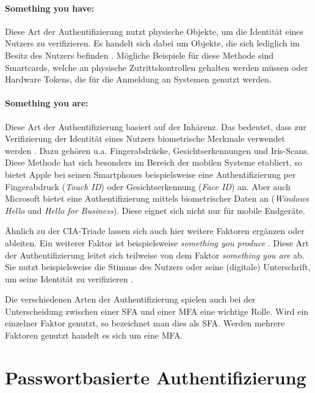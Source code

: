 \paragraph*{Something you have:}
Diese Art der Authentifizierung nutzt physische Objekte, um die Identität eines Nutzers zu verifizieren. Es handelt sich dabei um Objekte, die sich lediglich im Besitz des Nutzers befinden \cite{boonkrong2012security}. Mögliche Beispiele für diese Methode sind Smartcards, welche an physische Zutrittskontrollen gehalten werden müssen oder Hardware Tokens, die für die Anmeldung an Systemen genutzt werden.

\paragraph*{Something you are:}
Diese Art der Authentifizierung basiert auf der Inhärenz. Das bedeutet, dass zur Verifizierung der Identität eines Nutzers biometrische Merkmale verwendet werden \cite{boonkrong2012security}. Dazu gehören u.a. Fingerabdrücke, Gesichtserkennungen und Iris-Scans. Diese Methode hat sich besonders im Bereich der mobilen Systeme etabliert, so bietet Apple bei seinen Smartphones beispielsweise eine Authentifizierung per Fingerabdruck (\textit{Touch ID}) oder Gesichtserkennung (\textit{Face ID}) an. Aber auch Microsoft bietet eine Authentifizierung mittels biometrischer Daten an (\textit{Windows Hello} und \textit{Hello for Business}). Diese eignet sich nicht nur für mobile Endgeräte.

Ähnlich zu der CIA-Triade lassen sich auch hier weitere Faktoren ergänzen oder ableiten. Ein weiterer Faktor ist beispielsweise \textit{something you produce} \cite{boonkrong2012security}. Diese Art der Authentifizierung leitet sich teilweise von dem Faktor \textit{something you are} ab. Sie nutzt beispielsweise die Stimme des Nutzers oder seine (digitale) Unterschrift, um seine Identität zu verifizieren \cite{boonkrong2012security}. 

Die verschiedenen Arten der Authentifizierung spielen auch bei der Unterscheidung zwischen einer \ac{SFA} und einer  \ac{MFA} eine wichtige Rolle. Wird ein einzelner Faktor genutzt, so bezeichnet man dies als \ac{SFA}. Werden mehrere Faktoren genutzt handelt es sich um eine \ac{MFA}.

\section{Passwortbasierte Authentifizierung}\label{pw-auth}


